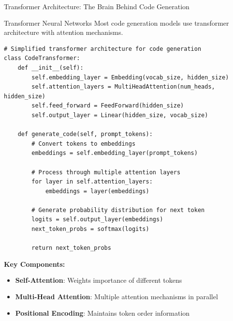 \documentclass{beamer}
\begin{document}
\begin{frame}[t,fragile]{Transformer Architecture: The Brain Behind Code Generation}
    \begin{block}{Transformer Neural Networks}
        Most code generation models use transformer architecture with attention mechanisms.
    \end{block}
    
    \begin{lstlisting}[style=code, basicstyle=\ttfamily\tiny]
# Simplified transformer architecture for code generation
class CodeTransformer:
    def __init__(self):
        self.embedding_layer = Embedding(vocab_size, hidden_size)
        self.attention_layers = MultiHeadAttention(num_heads, hidden_size)
        self.feed_forward = FeedForward(hidden_size)
        self.output_layer = Linear(hidden_size, vocab_size)
    
    def generate_code(self, prompt_tokens):
        # Convert tokens to embeddings
        embeddings = self.embedding_layer(prompt_tokens)
        
        # Process through multiple attention layers
        for layer in self.attention_layers:
            embeddings = layer(embeddings)
        
        # Generate probability distribution for next token
        logits = self.output_layer(embeddings)
        next_token_probs = softmax(logits)
        
        return next_token_probs
    \end{lstlisting}
    
    \textbf{Key Components:}
    \begin{itemize}
        \item \textbf{Self-Attention}: Weights importance of different tokens
        \item \textbf{Multi-Head Attention}: Multiple attention mechanisms in parallel
        \item \textbf{Positional Encoding}: Maintains token order information
    \end{itemize}
\end{frame}
\end{document}
